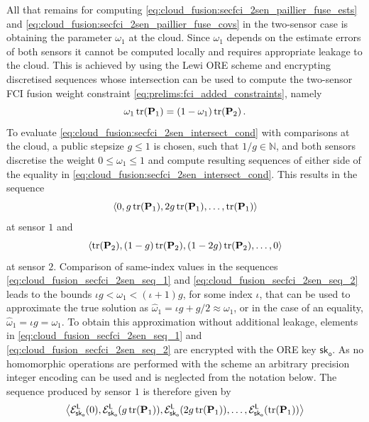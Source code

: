 All that remains for computing \eqref{eq:cloud_fusion:secfci_2sen_paillier_fuse_ests} and \eqref{eq:cloud_fusion:secfci_2sen_paillier_fuse_covs} in the two-sensor case is obtaining the parameter $\omega_1$ at the cloud. Since $\omega_1$ depends on the estimate errors of both sensors it cannot be computed locally and requires appropriate leakage to the cloud. This is achieved by using the Lewi ORE scheme and encrypting discretised sequences whose intersection can be used to compute the two-sensor FCI fusion weight constraint \eqref{eq:prelims:fci_added_constraints}, namely
\begin{equation}\label{eq:cloud_fusion:secfci_2sen_intersect_cond}
    \omega_1\operatorname{tr}({{\mathbf{P}}}_1) = (1-\omega_1)\operatorname{tr}({{\mathbf{P}}}_2)\,.
\end{equation}
To evaluate \eqref{eq:cloud_fusion:secfci_2sen_intersect_cond} with comparisons at the cloud, a public stepsize $g\leq 1$ is chosen, such that $1/g \in \mathbb{N}$, and both sensors discretise the weight $0\leq\omega_1\leq 1$ and compute resulting sequences of either side of the equality in \eqref{eq:cloud_fusion:secfci_2sen_intersect_cond}. This results in the sequence
\begin{equation}\label{eq:cloud_fusion_secfci_2sen_seq_1}
    \left\langle0, g\operatorname{tr}({{\mathbf{P}}}_1), 2g\operatorname{tr}({{\mathbf{P}}}_1),\dots,\operatorname{tr}({{\mathbf{P}}}_1)\right\rangle
\end{equation}
at sensor $1$ and
\begin{equation}\label{eq:cloud_fusion_secfci_2sen_seq_2}
    \left\langle\operatorname{tr}({{\mathbf{P}}}_2), (1-g)\operatorname{tr}({{\mathbf{P}}}_2), (1-2g)\operatorname{tr}({{\mathbf{P}}}_2),\dots,0\right\rangle
\end{equation}
at sensor $2$. Comparison of same-index values in the sequences \eqref{eq:cloud_fusion_secfci_2sen_seq_1} and \eqref{eq:cloud_fusion_secfci_2sen_seq_2} leads to the bounds $\iota g<\omega_1<(\iota+1)g$, for some index $\iota$, that can be used to approximate the true solution as $\hat{\omega}_1 = \iota g+g/2 \approx \omega_1$, or in the case of an equality, $\hat{\omega}_1 = \iota g = \omega_1$. To obtain this approximation without additional leakage, elements in \eqref{eq:cloud_fusion_secfci_2sen_seq_1} and \eqref{eq:cloud_fusion_secfci_2sen_seq_2} are encrypted with the ORE key $\mathsf{sk}_{\mathsf{o}}$. As no homomorphic operations are performed with the scheme an arbitrary precision integer encoding can be used and is neglected from the notation below. The sequence produced by sensor $1$ is therefore given by
\begin{equation}\label{eq:cloud_fusion:secfci_2sen_enc_seq_1}
    \left\langle\mathcal{E}^{\mathsf{L}}_{\mathsf{sk}_{\mathsf{o}}}(0), \mathcal{E}^{\mathsf{L}}_{\mathsf{sk}_{\mathsf{o}}}(g\operatorname{tr}({{\mathbf{P}}}_1)), \mathcal{E}^{\mathsf{L}}_{\mathsf{sk}_{\mathsf{o}}}(2g\operatorname{tr}({{\mathbf{P}}}_1)),\dots,\mathcal{E}^{\mathsf{L}}_{\mathsf{sk}_{\mathsf{o}}}(\operatorname{tr}({{\mathbf{P}}}_1))\right\rangle
\end{equation}
